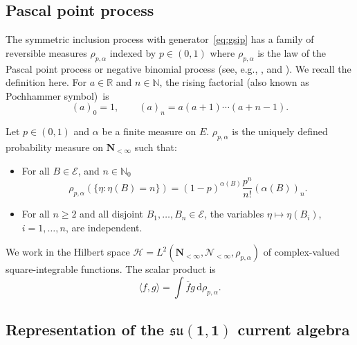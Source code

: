 \documentclass[10pt,a4paper]{amsart}
\numberwithin{equation}{section}
\newcommand{\N}{\mathbb{N}}
\newcommand{\R}{\mathbb{R}}
\newcommand{\dd}{\mathrm{d}} %
\newcommand{\1}{\mathbbm{1}}
\begin{document}
\subsection{Pascal point process} \label{sec:pascaldef}
The symmetric inclusion process with generator~\eqref{eq:gsip} has a family of reversible measures $\rho_{p,\alpha}$ indexed by $p\in (0,1)$ \cite[Theorem 5.2]{IntertwiningConsistent} where $\rho_{p,\alpha}$ is the law of the Pascal point process or negative binomial process (see, e.g., \cite[Section~2.7]{serfozo1990point}, \cite{kozubowski2008distributional} and \cite[Section~5.2]{IntertwiningConsistent}). We recall the definition here.
For $a\in \R$ and $n\in \N$, the rising factorial (also known as Pochhammer symbol)~is
\[
	(a)_0 = 1,\qquad (a)_n = a(a+1)\cdots (a+n-1).
\]

\begin{Definition}
 Let $p\in (0,1)$ and $\alpha$ be a finite measure on $E$. $\rho_{p,\alpha}$ is the uniquely defined probability measure on $\mathbf N_{<\infty}$ such that:
 \begin{itemize}\itemsep=0pt
 	\item For all $B\in \mathcal E$, and $n\in \N_0$
 	\begin{equation} \label{eq:negbin}
 		\rho_{p,\alpha}(\{\eta\colon \eta(B) =n\}) = (1-p)^{\alpha(B)} \frac{p^n}{n!} (\alpha(B))_{n}.
 	\end{equation}
 	\item For all $n \geq 2$ and all disjoint $B_1,\ldots, B_n\in \mathcal E$, the variables $\eta\mapsto \eta(B_i)$, $i=1,\ldots, n$, are independent.
 \end{itemize}
\end{Definition}

We work in the Hilbert space $\mathcal H = L^2(\mathbf N_{<\infty}, \mathcal N_{<\infty}, \rho_{p,\alpha})$ of complex-valued square-integrable functions. The scalar product is
\[
	\langle f,g \rangle = \int \overline{f} g\, \dd\rho_{p,\alpha}.
\]

\subsection[Representation of the su(1,1)]{Representation of the $\boldsymbol{\mathfrak{su}(1,1)}$ current algebra} \label{sec:su11}
\end{document}
